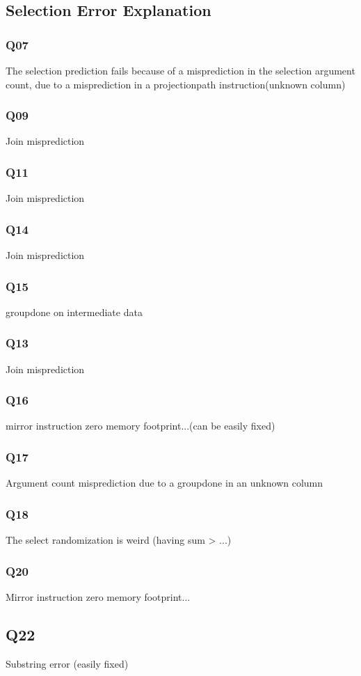 \subsection{Selection Error Explanation}

\subsubsection{Q07}
The selection prediction fails because of a misprediction in the selection
argument count, due to a misprediction in a projectionpath instruction(unknown column)
\subsubsection{Q09}
Join misprediction
\subsubsection{Q11}
Join misprediction
\subsubsection{Q14}
Join misprediction
\subsubsection{Q15}
groupdone on intermediate data
\subsubsection{Q13}
Join misprediction
\subsubsection{Q16}
mirror instruction zero memory footprint...(can be easily fixed)
\subsubsection{Q17}
Argument count misprediction due to a groupdone in an unknown column
\subsubsection{Q18}
The select randomization is weird (having sum > ...)
\subsubsection{Q20}
Mirror instruction zero memory footprint...
\subsection{Q22}
Substring error (easily fixed)

